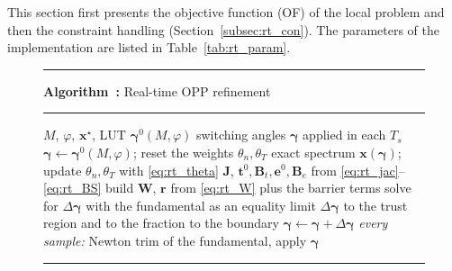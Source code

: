 \documentclass[conference]{IEEEtran}
\newcommand{\gv}{\boldsymbol{\gamma}}
\begin{document}
This section first presents the objective function (OF) of the local
problem and then the constraint handling
(Section~\ref{subsec:rt_con}). The parameters of the implementation are
listed in Table~\ref{tab:rt_param}.

\begin{figure}[!t]
    \label{alg:rtopp}
    \hrule\smallskip
    \noindent\textbf{Algorithm~\thealgcount:} Real-time OPP refinement
    \smallskip\hrule\smallskip
    \footnotesize
    \begin{algorithmic}[1]
        \REQUIRE $M$, $\varphi$, $\mathbf{x}^\star$, LUT $\gv^0(M,\varphi)$
        \ENSURE switching angles $\gv$ applied in each $T_s$
        \LOOP
                \STATE $\gv \leftarrow \gv^0(M,\varphi)$; reset the weights
                       $\theta_n,\theta_T$
            \ENDIF
            \STATE exact spectrum $\mathbf{x}(\gv)$; update
                   $\theta_n,\theta_T$ with \eqref{eq:rt_theta}
            \STATE $\mathbf{J}$, $\mathbf{t}^0,\mathbf{B}_t,\mathbf{e}^0,
                   \mathbf{B}_e$ from \eqref{eq:rt_jac}--\eqref{eq:rt_BS}
            \STATE build $\mathbf{W}$, $\mathbf{r}$ from \eqref{eq:rt_W}
                   plus the barrier terms
            \STATE solve for $\Delta\gv$ with the fundamental as an equality
            \STATE limit $\Delta\gv$ to the trust region and to the
                   fraction to the boundary
            \STATE $\gv \leftarrow \gv+\Delta\gv$
            \STATE \textit{every sample:} Newton trim of the fundamental,
                   apply $\gv$
        \ENDLOOP
    \end{algorithmic}
    \smallskip\hrule
\end{figure}
\end{document}
